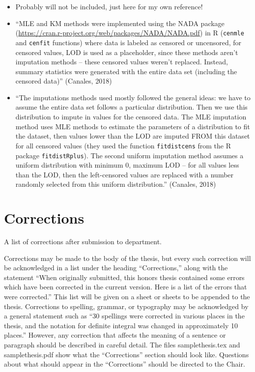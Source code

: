 \documentclass[12pt, twoside]{amherstthesis}
\begin{document}
\begin{itemize}
\item
  Probably will not be included, just here for my own reference!
\item
  ``MLE and KM methods were implemented using the NADA package (\url{https://cran.r-project.org/web/packages/NADA/NADA.pdf}) in R (\texttt{cenmle} and \texttt{cenfit} functions) where data is labeled as censored or uncensored, for censored values, LOD is used as a placeholder, since these methods aren't imputation methods -- these censored values weren't replaced. Instead, summary statistics were generated with the entire data set (including the censored data)'' (Canales, 2018)
\item
  ``The imputations methods used mostly followed the general ideas: we have to assume the entire data set follows a particular distribution. Then we use this distribution to impute in values for the censored data. The MLE imputation method uses MLE methods to estimate the parameters of a distribution to fit the dataset, then values lower than the LOD are imputed FROM this dataset for all censored values (they used the function \texttt{fitdistcens} from the R package \texttt{fitdistRplus}). The second uniform imputation method assumes a uniform distribution with minimum 0, maximum LOD -- for all values less than the LOD, then the left-censored values are replaced with a number randomly selected from this uniform distribution.'' (Canales, 2018)
\end{itemize}
\hypertarget{corrections}{%
\chapter*{Corrections}\label{corrections}}

A list of corrections after submission to department.

Corrections may be made to the body of the thesis, but every such correction will be acknowledged in a list under the heading ``Corrections,'' along with the statement ``When originally submitted, this honors thesis contained some errors which have been corrected in the current version. Here is a list of the errors that were corrected.'' This list will be given on a sheet or sheets to be appended to the thesis. Corrections to spelling, grammar, or typography may be acknowledged by a general statement such as ``30 spellings were corrected in various places in the thesis, and the notation for definite integral was changed in approximately 10 places.'' However, any correction that affects the meaning of a sentence or paragraph should be described in careful detail. The files samplethesis.tex and samplethesis.pdf show what the ``Corrections'' section should look like. Questions about what should appear in the ``Corrections'' should be directed to the Chair.
\end{document}
